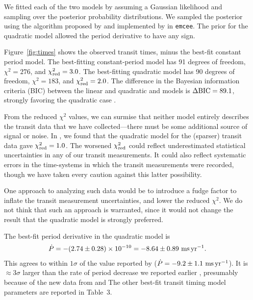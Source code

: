 \documentclass[12pt,twocolumn,tighten]{aastex62}
\begin{document}
We fitted each of the two models by assuming a Gaussian likelihood and
sampling over the posterior probability distributions.  We sampled the
posterior using the algorithm proposed by
\citet{goodman_ensemble_2010} and implemented by
\citet{foreman-mackey_emcee_2013} in \texttt{emcee}.  The prior for
the quadratic model allowed the period derivative to have any sign.

Figure~\ref{fig:times} shows the observed transit times, minus the
best-fit constant period model.  The best-fitting constant-period
model has 91 degrees of freedom, $\chi^2 = 276$,  and $\chi^2_{\rm
red}=3.0$.  The best-fitting quadratic model has 90 degrees of freedom,
$\chi^2 = 183$, and $\chi^2_{\rm red}=2.0$.  The difference in the
Bayesian information criteria (BIC) between the linear and quadratic
and models is $\Delta {\rm BIC} = 89.1$, strongly favoring the
quadratic case \citep{kass_bayes_1995}.

From the reduced $\chi^2$ values, we can surmise that neither model
entirely describes the transit data that we have collected---there
must be some additional source of signal or noise. In
\citet{bouma_wasp4b_2019}, we found that the quadratic model for the
(sparser) transit data gave $\chi^2_{\rm red}=1.0$.  The worsened
$\chi^2_{\rm red}$ could reflect underestimated statistical
uncertainties in any of our transit measurements.  It could also
reflect systematic errors in the time-systems in which the transit
measurements were recorded, though we have taken every caution against
this latter possibility.

One approach to analyzing such data would be to introduce a fudge
factor to inflate the transit measurement uncertainties, and lower the
reduced $\chi^2$.  We do not think that such an approach is warranted,
since it would not change the result that the quadratic model is
strongly preferred.

The best-fit period derivative in the quadratic model is
\begin{equation}
\dot{P}
  = - (2.74 \pm 0.28)\times 10^{-10}
  = - 8.64 \pm 0.89~{\rm ms}\,{\rm yr}^{-1}.
  \label{eq:dP_dt_obs}
\end{equation}
This agrees to within $1\sigma$ of the value reported by
\citet{southworth_transit_2019} ($\dot{P} = - 9.2 \pm 1.1~{\rm
ms}\,{\rm yr}^{-1}$).  It is $\approx$3$\sigma$ larger than the rate
of period decrease we reported earlier \citep[$- 12.6 \pm 1.2~{\rm
ms}\,{\rm yr}^{-1}$;][]{bouma_wasp4b_2019}, presumably because of
the new data from \citeauthor{southworth_transit_2019}
and \citeauthor{baluev_2019}  The other best-fit
transit timing model parameters are reported in Table~3.
\end{document}

